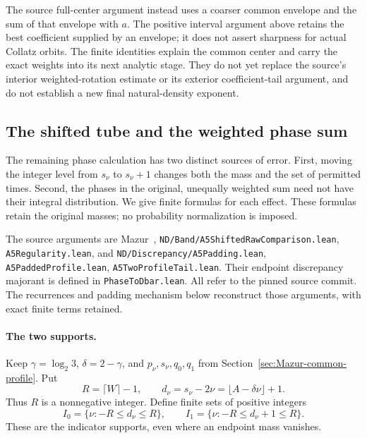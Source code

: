 The source full-center argument instead uses a coarser common
envelope and the sum of that envelope with $a$. The positive
interval argument above retains the best coefficient supplied by
an envelope; it does not assert sharpness for actual Collatz orbits.
The finite identities explain the common center and carry the exact
weights into its next analytic stage. They do not yet replace the
source's interior weighted-rotation estimate or its exterior
coefficient-tail argument, and do not establish a new final
natural-density exponent.

\subsection{The shifted tube and the weighted phase sum}
\label{sec:Mazur-weighted-phase}

The remaining phase calculation has two distinct sources of error.
First, moving the integer level from $s_\nu$ to $s_\nu+1$ changes
both the mass and the set of permitted times. Second, the phases in
the original, unequally weighted sum need not have their integral
distribution. We give finite formulas for each effect. These formulas
retain the original masses; no probability normalization is imposed.

The source arguments are Mazur~\cite{Mazur2026v2},
\texttt{ND/Band/A5ShiftedRawComparison.lean},
\texttt{A5Regularity.lean}, and
\texttt{ND/Discrepancy/A5Padding.lean},
\texttt{A5PaddedProfile.lean}, \texttt{A5TwoProfileTail.lean}.
Their endpoint discrepancy majorant is defined in
\texttt{PhaseToDbar.lean}. All refer to the pinned source commit.
The recurrences and padding mechanism below reconstruct those
arguments, with exact finite terms retained.

\paragraph{The two supports.}
Keep $\gamma=\log_2 3$, $\delta=2-\gamma$, and $p_\nu,s_\nu,q_0,q_1$
from Section~\ref{sec:Mazur-common-profile}. Put
\[
 R=\lceil W\rceil-1,\qquad
 d_\nu=s_\nu-2\nu=\lfloor A-\delta\nu\rfloor+1 .
\]
Thus $R$ is a nonnegative integer. Define finite sets of positive integers
\[
 I_0=\{\nu:-R\le d_\nu\le R\},\qquad
 I_1=\{\nu:-R\le d_\nu+1\le R\}.
\]
These are the indicator supports, even where an endpoint mass vanishes.

